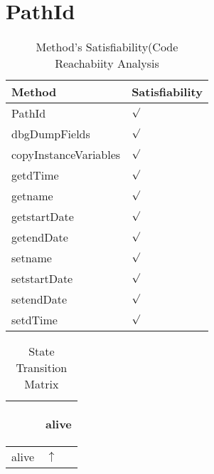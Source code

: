 \documentclass[10pt]{article}
\begin{document}
\section{{\color{Fuchsia}PathId}}
\label{PathId}
\begin{longtable}{|l|l|}
\caption{Method's Satisfiability(Code Reachabiity Analysis}\\
\hline
Method & Satisfiability\\
\hline
PathId&{\color{blue}$\surd$}\\
\hline
dbgDumpFields&{\color{blue}$\surd$}\\
\hline
copyInstanceVariables&{\color{blue}$\surd$}\\
\hline
getdTime&{\color{blue}$\surd$}\\
\hline
getname&{\color{blue}$\surd$}\\
\hline
getstartDate&{\color{blue}$\surd$}\\
\hline
getendDate&{\color{blue}$\surd$}\\
\hline
setname&{\color{blue}$\surd$}\\
\hline
setstartDate&{\color{blue}$\surd$}\\
\hline
setendDate&{\color{blue}$\surd$}\\
\hline
setdTime&{\color{blue}$\surd$}\\
\hline
\end{longtable}
\begin{longtable}{|l|l|}
\caption{State Transition Matrix}\\
\hline
&\begin{sideways}alive\end{sideways}\\
\hline
alive&{\color{blue}$\uparrow$}\\
\hline
\end{longtable}
\end{document}
